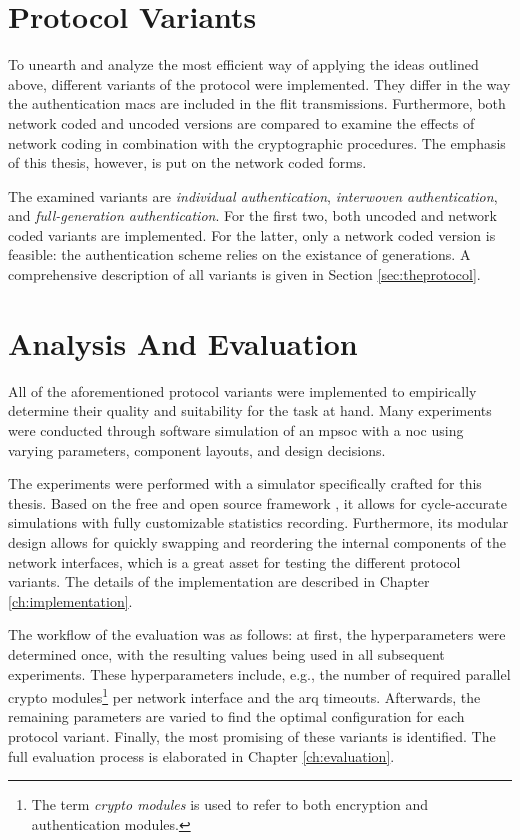 \section{Protocol Variants}\label{sec:protocolvariants}
To unearth and analyze the most efficient way of applying the ideas outlined above, different variants of the protocol were implemented. They differ
in the way the authentication \glspl{mac} are included in the flit transmissions. Furthermore, both network coded and uncoded versions are compared to
examine the effects of network coding in combination with the cryptographic procedures. The emphasis of this thesis, however, is put on the network
coded forms.

The examined variants are \textit{individual authentication}, \textit{interwoven authentication}, and \textit{full-generation authentication}. For the
first two, both uncoded and network coded variants are implemented. For the latter, only a network coded version is feasible: the authentication
scheme relies on the existance of generations. A comprehensive description of all variants is given in Section
\ref{sec:theprotocol}. %

\section{Analysis And Evaluation}
All of the aforementioned protocol variants were implemented to empirically determine their quality and suitability for the task at hand. Many
experiments were conducted through software simulation of an \gls{mpsoc} with a \gls{noc} using varying parameters, component layouts, and design
decisions.

The experiments were performed with a simulator specifically crafted for this thesis. Based on the free and open source framework \textit{\omnet{}}
\cite{omnet}, it allows for cycle-accurate simulations with fully customizable statistics recording. Furthermore, its modular design allows for
quickly swapping and reordering the internal components of the network interfaces, which is a great asset for testing the different protocol variants.
The details of the implementation are described in Chapter \ref{ch:implementation}.

The workflow of the evaluation was as follows: at first, the hyperparameters were determined once, with the resulting values being used in all
subsequent experiments. These hyperparameters include, e.g., the number of required parallel crypto modules\footnote{The term \textit{crypto modules} is
used to refer to both encryption and authentication modules.} per network interface and the \gls{arq} timeouts. Afterwards, the remaining parameters are
varied to find the optimal configuration for each protocol variant. Finally, the most promising of these variants is identified. The full evaluation
process is elaborated in Chapter \ref{ch:evaluation}.
